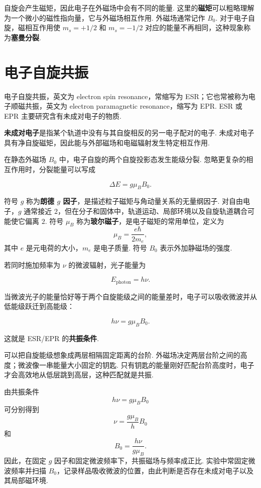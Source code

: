 \documentclass[UTF8,11pt,a4paper,openany]{ctexbook}
\newcommand{\term}[1]{\textbf{#1}}
\begin{document}
自旋会产生磁矩，因此电子在外磁场中会有不同的能量. 这里的\term{磁矩}可以粗略理解为一个微小的磁性指向量，它与外磁场相互作用. 外磁场通常记作 $B_0$. 对于电子自旋，磁相互作用使 $m_s=+1/2$ 和 $m_s=-1/2$ 对应的能量不再相同，这种现象称为\term{塞曼分裂}. 

\section{电子自旋共振}

电子自旋共振，英文为 electron spin resonance，常缩写为 ESR；它也常被称为电子顺磁共振，英文为 electron paramagnetic resonance，缩写为 EPR. ESR 或 EPR 主要研究含有未成对电子的物质. 

\begin{definitionbox}
\term{未成对电子}是指某个轨道中没有与其自旋相反的另一电子配对的电子. 未成对电子具有净自旋磁矩，因此能与外部磁场和电磁辐射发生特定相互作用. 
\end{definitionbox}

在静态外磁场 $B_0$ 中，电子自旋的两个自旋投影态发生能级分裂. 忽略更复杂的相互作用时，分裂能量可以写成

\[
\Delta E=g\mu_BB_0.
\]

\begin{notationbox}
符号 $g$ 称为\term{朗德 $g$ 因子}，是描述粒子磁矩与角动量关系的无量纲因子. 对自由电子，$g$ 通常接近 $2$，但在分子和固体中，轨道运动、局部环境以及自旋轨道耦合可能使它偏离 $2$. 符号 $\mu_B$ 称为\term{玻尔磁子}，是电子磁矩的常用单位，定义为
\[
\mu_B=\frac{e\hbar}{2m_e},
\]
其中 $e$ 是元电荷的大小，$m_e$ 是电子质量. 符号 $B_0$ 表示外加静磁场的强度. 
\end{notationbox}

若同时施加频率为 $\nu$ 的微波辐射，光子能量为

\[
E_{\mathrm{photon}}=h\nu.
\]

当微波光子的能量恰好等于两个自旋能级之间的能量差时，电子可以吸收微波并从低能级跃迁到高能级：

\[
h\nu=g\mu_BB_0.
\]

这就是 ESR/EPR 的\term{共振条件}. 

\begin{analogybox}
可以把自旋能级想象成两层相隔固定距离的台阶. 外磁场决定两层台阶之间的高度；微波像一串能量大小固定的钥匙. 只有钥匙的能量刚好匹配台阶高度时，电子才会高效地从低层跳到高层，这种匹配就是共振. 
\end{analogybox}

\begin{derivationbox}
由共振条件
\[
h\nu=g\mu_BB_0
\]
可分别得到
\[
\nu=\frac{g\mu_B}{h}B_0
\]
和
\[
B_0=\frac{h\nu}{g\mu_B}.
\]
因此，在固定 $g$ 因子和固定微波频率下，共振磁场与频率成正比. 实验中常固定微波频率并扫描 $B_0$，记录样品吸收微波的位置，由此判断是否存在未成对电子以及其局部磁环境. 
\end{derivationbox}
\end{document}
